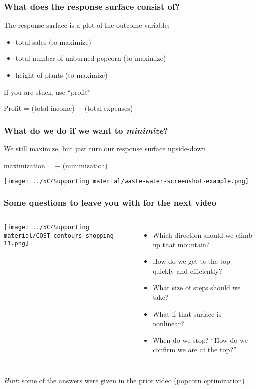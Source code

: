 \begin{frame}\frametitle{What does the response surface consist of?}
	
	The response surface is a plot of the outcome variable:
	\begin{itemize}
		\item	total sales (to maximize)
		\item	total number of unburned popcorn (to maximize)
		\item	height of plants (to maximize)
	\end{itemize}
	\vspace{1cm}
	If you are stuck, use ``profit''
	\begin{exampleblock}{}
		\centerline{\color{myGreen}Profit = (total income) $-$ (total expenses)}
	\end{exampleblock}
	
\end{frame}

\begin{frame}\frametitle{What do we do if we want to \emph{\textbf{minimize}}?}
	
	We still maximize, but just turn our response surface upside-down
	
	\vspace{.5cm}
	\begin{exampleblock}{}
		\centerline{\color{myGreen}maximization = $-$ (minimization)}
	\end{exampleblock}
	\centerline{\texttt{[image: ../5C/Supporting material/waste-water-screenshot-example.png]}}
	
\end{frame}

\begin{frame}\frametitle{Some questions to leave you with for the next video }
	\begin{columns}[c]
			\centerline{\texttt{[image: ../5C/Supporting material/COST-contours-shopping-11.png]}}

			\begin{itemize}
				\item	Which direction should we climb up that mountain? 
				\item	How do we get to the top quickly and efficiently? \pause
				\item	What size of steps should we take? \pause
				\item	What if that surface is nonlinear? \pause
				\item	When do we stop? ``How do we confirm we are at the top?''
			\end{itemize}
	\end{columns}
	 
	\pause
	\vspace{1cm}
	{\color{myOrange}\emph{Hint}: some of the answers were given in the prior video (popcorn optimization)}
\end{frame}



